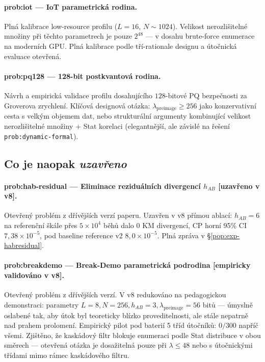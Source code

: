 \documentclass[11pt,a4paper]{article}
\begin{document}
\paragraph{prob:iot --- IoT parametrická rodina.} Plná kalibrace low-resource profilu ($L = 16$, $N \sim 1024$). Velikost nerozlišitelné množiny při těchto parametrech je pouze $2^{48}$ --- v dosahu brute-force enumerace na moderních GPU. Plná kalibrace podle tří-rationale designu a útočnická evaluace otevřená.

\paragraph{prob:pq128 --- 128-bit postkvantová rodina.} Návrh a empirická validace profilu dosahujícího $128$-bitové PQ bezpečnosti za Groverova zrychlení. Klíčová designová otázka: $\lambda_\text{preimage} \geq 256$ jako konzervativní cesta s velkým objemem dat, nebo strukturální argumenty kombinující velikost nerozlišitelné množiny + Stat korelaci (elegantnější, ale závislé na řešení \texttt{prob:dynamic-formal}).

\subsection{Co je naopak \emph{uzavřeno}}

\paragraph{prob:hab-residual --- Eliminace reziduálních divergencí $h_{AB}$ \textbf{[uzavřeno v v8]}.} Otevřený problém z dřívějších verzí paperu. Uzavřen v v8 přímou ablací: $h_{AB} = 6$ na referenční škále přes $5 \times 10^4$ běhů dalo $0$ KM divergencí, CP horní 95\% CI $7{,}38 \times 10^{-5}$, pod baseline reference v2 $8{,}0 \times 10^{-5}$. Plná zpráva v §\ref{pop:exp-habresidual}.

\paragraph{prob:breakdemo --- Break-Demo parametrická podrodina \textbf{[empiricky validováno v v8]}.} Otevřený problém z dřívějších verzí. V v8 redukováno na pedagogickou demonstraci: parametry $L = 8, N = 256, h_{AB} = 3, \lambda_\text{preimage} = 56$ bitů --- úmyslně oslabené tak, aby útok byl teoreticky blízko proveditelnosti, ale stále nepatrně nad prahem prolomení. Empirický pilot pod baterií 5 tříd útočníků: $0/300$ napříč všemi. Zjištěno, že kaskádový filtr blokuje enumeraci podle Stat distribuce v obou směrech --- otevřená otázka je dosažitelná pouze při $\lambda \leq 48$ nebo s útočnickými třídami mimo rámec kaskádového filtru.
\end{document}
